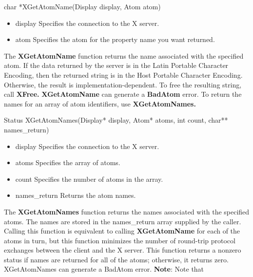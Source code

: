 \documentclass{report}
\begin{document}
\begin{itemize}
        \bigbreak \noindent 
        \begin{cppcode}
        char *XGetAtomName(Display display, Atom atom)
        \end{cppcode}
        \begin{itemize}
            \item display Specifies the connection to the X server.
            \item atom Specifies the atom for the property name you want returned.
        \end{itemize}
        The \textbf{XGetAtomName} function returns the name associated with the specified atom. If the data returned by the server is in the Latin Portable Character Encoding, then the returned string is in the Host Portable Character Encoding. Otherwise, the result is implementation-dependent. To free the resulting string, call \textbf{XFree.}
        \bigbreak \noindent 
        \textbf{XGetAtomName} can generate a \textbf{BadAtom} error.
        \bigbreak \noindent 
        To return the names for an array of atom identifiers, use \textbf{XGetAtomNames.}
        \bigbreak \noindent 
        \begin{cppcode}
            Status XGetAtomNames(Display* display, Atom* atoms, int count, char** names_return)
        \end{cppcode}
        \begin{itemize}
            \item display Specifies the connection to the X server.
            \item atoms Specifies the array of atoms.
            \item count Specifies the number of atoms in the array.
            \item names\_return Returns the atom names.
        \end{itemize}
        The \textbf{XGetAtomNames} function returns the names associated with the specified atoms. The names are stored in the names\_return array supplied by the caller. Calling this function is equivalent to calling \textbf{XGetAtomName} for each of the atoms in turn, but this function minimizes the number of round-trip protocol exchanges between the client and the X server. This function returns a nonzero status if names are returned for all of the atoms; otherwise, it returns zero.
        \bigbreak \noindent 
        XGetAtomNames can generate a BadAtom error.
        \bigbreak \noindent 
        \textbf{Note}: Note that 
        \bigbreak \noindent 
        \begin{cppcode}

\end{cppcode}
\end{itemize}
\end{document}
